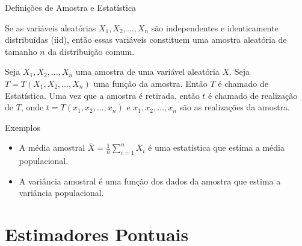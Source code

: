 \documentclass[12pt]{beamer}
\begin{document}
\begin{frame}{Definições de Amostra e Estatística}
	\begin{definicao}\label{def1}
		\justifying
		Se as variáveis aleatórias $X_1, X_2, \dots, X_{n}$ são independentes e identicamente distribuídas (iid), então essas variáveis constituem uma amostra aleatória de tamanho $n$ da distribuição comum.
	\end{definicao}
	
	\pause
	
	\begin{definicao}\label{def2}
		\justifying
		Seja $X_1, X_2, \dots, X_{n}$ uma amostra de uma variável aleatória $X$. Seja $T = T(X_1, X_2, \dots, X_{n})$ uma função da amostra. Então $T$ é chamado de Estatística. Uma vez que a amostra é retirada, então $t$ é chamado de realização de $T$, onde $t = T(x_1, x_2, \dots, x_{n})$ e $x_1, x_2, \dots, x_{n}$ são as realizações da amostra.
	\end{definicao}
	
\end{frame}

\begin{frame}{}
	\begin{block}{Exemplos}
		\begin{itemize}
			\item A média amostral $\bar{X} = \frac{1}{n}\sum_{i=1}^n X_i$ é uma estatística que estima a média populacional.
			\item A variância amostral é uma função dos dados da amostra que estima a variância populacional.
		\end{itemize}
	\end{block}
\end{frame}


\section{Estimadores Pontuais}
\end{document}
